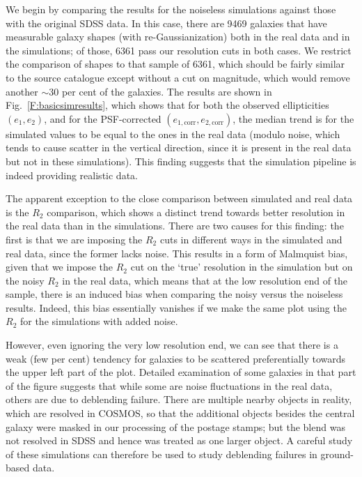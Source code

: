 \documentclass[twocolumn,useAMS,usenatbib]{mn2e}
\newcommand{\newtext}{}
\begin{document}
We begin by comparing the results for the \newtext{noiseless} simulations against
those with the original SDSS data.  In this case, there are 9469
galaxies that have measurable galaxy shapes (with re-Gaussianization)
both in the real data and in the simulations; of those, 6361 pass our
resolution cuts in both cases.  We restrict the comparison of shapes
to that sample of 6361, which should be fairly similar to the
source catalogue except without a cut on magnitude, which would remove
another $\sim 30$ per cent of the galaxies.  The results
are shown in Fig.~\ref{F:basicsimresults}, which shows that for both
the observed ellipticities $(e_1, e_2)$, and for
the PSF-corrected $(e_{1,\mathrm{corr}}, e_{2,\mathrm{corr}})$, the median trend is for the simulated values
to be equal to the ones in the real data (modulo noise, which tends to
cause scatter in the vertical direction, since it is present in the
real data but not in these simulations).  This finding suggests that
the simulation pipeline is indeed providing realistic data.  

\newtext{The apparent exception to the close comparison between
  simulated and real data is the $R_2$ comparison, which shows a
  distinct trend towards better resolution in the real data
  than in the simulations.  There are two causes for this finding: the
  first is that we are imposing the $R_2$ cuts in different ways in
  the simulated and real data, since the former lacks noise. This
  results in a form of Malmquist bias, given that we impose the
  $R_2$ cut on the `true' resolution in the simulation but on the
  noisy $R_2$ in the real data, which means that at the low resolution
  end of the sample, there is an induced bias when comparing the noisy
  versus the noiseless results.  Indeed, this bias essentially vanishes if we make the same plot using the $R_2$ for the simulations
  with added noise.}  

\newtext{However, even ignoring the very low
  resolution end, we can see that there is a weak (few per cent)
  tendency for galaxies to be scattered preferentially towards the
  upper left part of the plot.  Detailed examination of some galaxies
  in that part of the figure suggests that while some are noise
  fluctuations in the real data, others are due to deblending failure. There are multiple nearby objects in reality, which are
  resolved in COSMOS, so that the additional objects besides the
  central galaxy were masked in our processing of the postage stamps;
  but the blend was not resolved in SDSS and hence was treated as one
  larger object.  A careful study of these simulations can therefore
  be used to study deblending failures in ground-based data.}
\end{document}
